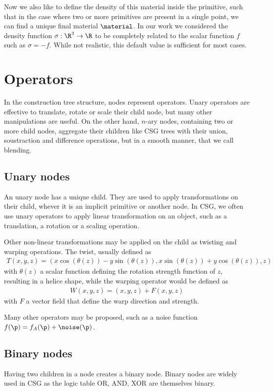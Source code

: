 Now we also like to define the density of this material inside the primitive, such that in the case where two or more primitives are present in a single point, we can find a unique final material $\material$. In our work we considered the density function $\sigma: \R^3 \to \R$ to be completely related to the scalar function $f$ such as $\sigma = -f$. While not realistic, this default value is sufficient for most cases.

\section{Operators}
In the construction tree structure, nodes represent operators. Unary operators are effective to translate, rotate or scale their child node, but many other manipulations are useful. On the other hand, $n$-ary nodes, containing two or more child nodes, aggregate their children like CSG trees with their union, soustraction and difference operations, but in a smooth manner, that we call blending.

\subsection{Unary nodes}
An unary node has a unique child. They are used to apply transformations on their child, whever it is an implicit primitive or another node. In CSG, we often use unary operators to apply linear transformation on an object, such as a translation, a rotation or a scaling operation. 

Other non-linear transformations may be applied on the child as twisting and warping operations. The twist, usually defined as 
\begin{align}
    T(x, y, z) = \left( x \cos(\theta(z)) - y \sin(\theta(z)), x \sin(\theta(z)) + y \cos(\theta(z)), z \right)
\end{align}
with $\theta(z)$ a scalar function defining the rotation strength function of $z$, resulting in a helice shape, while the warping operator would be defined as 
\begin{align}
    W(x,y,z) = (x,y,z) + F(x, y, z)
\end{align}
with $F$ a vector field that define the warp direction and strength.
    

Many other operators may be proposed, such as a noise function $f(\p) = f_A(\p) + \noise(\p)$.

\subsection{Binary nodes}
Having two children in a node creates a binary node. Binary nodes are widely used in CSG as the logic table OR, AND, XOR are themselves binary. 

